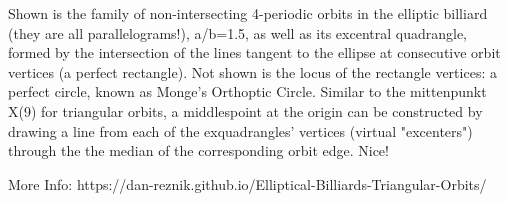 Shown is the family of non-intersecting 4-periodic orbits in the elliptic billiard (they are all parallelograms!), a/b=1.5, as well as its excentral quadrangle, formed by the intersection of the lines tangent to the ellipse at consecutive  orbit vertices (a perfect rectangle). Not shown is the locus of the rectangle vertices: a perfect circle, known as Monge's Orthoptic Circle. Similar to the mittenpunkt X(9) for triangular orbits, a middlespoint at the origin can be constructed by drawing a line from each of the exquadrangles' vertices (virtual "excenters") through the the median of the corresponding orbit edge. Nice!

More Info: https://dan-reznik.github.io/Elliptical-Billiards-Triangular-Orbits/